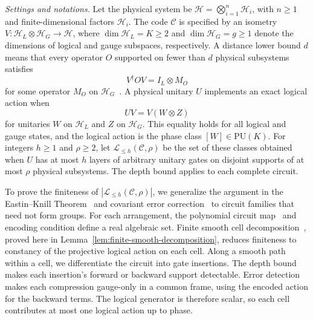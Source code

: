 \documentclass[aps,prl,reprint,notitlepage,nofootinbib,nobibnotes]{revtex4-2}
\newcommand{\HH}{\mathcal H}
\newcommand{\PU}{\mathrm{PU}}
\newcommand{\id}{I}
\begin{document}
 \textit{Settings and notations.} Let the physical system be \(\HH=\bigotimes_{i=1}^{n}\HH_i\), with
\(n\ge1\) and finite-dimensional factors $\HH_i$. The code \(\mathcal C\) is specified
by an isometry \(V:\HH_L\otimes\HH_G\longrightarrow\HH\), where
\(\dim\HH_L=K\ge2\) and \(\dim\HH_G=g\ge1\) denote the dimensions of logical and
gauge subspaces, respectively.
A distance lower bound \(d\) means that every operator \(O\) supported on
fewer than \(d\) physical subsystems satisfies
\begin{equation}\label{eq:correctable}
  V^\dagger O V=\id_L\otimes M_O
\end{equation}
for some operator \(M_O\) on \(\HH_G\)~\cite{KL,Kribs}.
A physical unitary \(U\) implements an exact logical action when
\begin{equation}\label{eq:encoded}
  UV=V(W\otimes Z)
\end{equation}
for unitaries \(W\) on \(\HH_L\) and \(Z\) on \(\HH_G\).
This equality holds for all logical and gauge states, and the logical
action is the phase class \([W]\in\PU(K)\).
For integers \(h\ge1\) and \(\rho\ge2\), let
\(\mathcal L_{\le h}(\mathcal C,\rho)\) be the set of these classes obtained
when \(U\) has at most \(h\) layers of arbitrary unitary gates on disjoint
supports of at most \(\rho\) physical subsystems.
The depth bound applies to each complete circuit.

To prove the finiteness of $|\mathcal L_{\le h}(\mathcal C,\rho)|$, we generalize the argument in 
the Eastin--Knill Theorem~\cite{EK} and covariant error
correction~\cite{Faist,LiuZhou} to circuit families that need not form
groups. For each arrangement, the polynomial circuit
map~\cite{Haferkamp} and encoding condition define a real algebraic
set. Finite smooth cell
decomposition~\cite[Cor.~8.4]{Plaumann},
proved here in Lemma~\ref{lem:finite-smooth-decomposition}, reduces
finiteness to constancy of the projective logical action on each cell.
Along a smooth path within a cell, we differentiate the circuit into
gate insertions. The depth bound makes each insertion's forward or
backward support detectable. Error detection makes each compression
gauge-only in a common frame, using the encoded action for the backward
terms. The logical generator is therefore scalar, so each cell
contributes at most one logical action up to phase.
\end{document}
